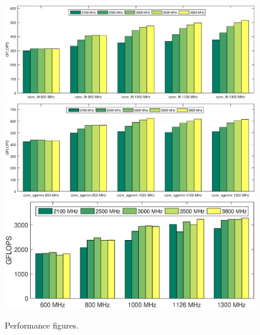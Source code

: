 \documentclass[conference]{IEEEtran}
\begin{document}
\begin{figure}[ht]
	\centering     %
	\subfigure%
	{
		\includegraphics[width=0.9\linewidth]{perf_fft.eps}
	}
	\subfigure%
	{
		\includegraphics[width=0.9\linewidth]{perf_sgemm.eps}
	}
	\subfigure%
	{
		\includegraphics[width=0.9\linewidth]{perf_winograd.eps}
	}
	\caption{\label{fig:perf} Performance figures.}
\end{figure}
\end{document}

